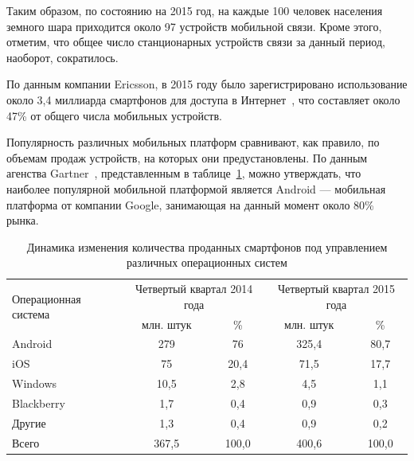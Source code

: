 Таким образом, по состоянию на 2015 год, на каждые 100 человек
населения земного шара приходится около 97 устройств мобильной связи.
Кроме этого, отметим, что общее число станционарных устройств связи
за данный период, наоборот, сократилось.

По данным компании Ericsson, в 2015 году было зарегистрировано использование
около 3{,}4 миллиарда смартфонов для доступа в Интернет~\cite{ericsson_mobility_report},
что составляет около 47\% от общего числа мобильных устройств.

Популярность различных мобильных платформ сравнивают, как правило,
по объемам продаж устройств, на которых они предустановлены.
По данным агенства Gartner~\cite{gartner_smartphone_stat}, представленным
в таблице~\ref{tbl:gartner_platform_stat}, можно утверждать, что наиболее популярной
мобильной платформой является Android --- мобильная платформа от
компании Google, занимающая на данный момент около 80\% рынка.

\begin{table} [h!]
  \caption{
    Динамика изменения количества проданных смартфонов под
    управлением различных операционных систем
  }\label{tbl:gartner_platform_stat}
    \begin{tabular}{| m{6.6cm} | c | c | c | c |}
      \hline

      \multirow{2}{*}{
      \parbox{6.6cm}{
      \smallskip
      \centering Операционная система
      \smallskip
      }
      }
      & \multicolumn{2}{c|}{
          \parbox{4.5cm}{
            \smallskip
            \centering Четвертый квартал 2014 года
            \smallskip
          }
        }
      & \multicolumn{2}{c|}{
          \parbox{4.5cm}{
            \smallskip
            \centering Четвертый квартал 2015 года
            \smallskip
          }
        } \\
      \cline{2-5}

      & млн. штук & \% & млн. штук & \% \\
      \hline

      Android &  279 & 76 & 325{,}4 & 80{,}7 \\
      \hline

      iOS &  75 & 20{,}4 & 71{,}5 & 17{,}7 \\
      \hline

      Windows & 10{,}5 & 2{,}8 & 4{,}5 & 1{,}1 \\
      \hline

      Blackberry & 1{,}7 & 0{,}4 & 0{,}9 & 0{,}3 \\
      \hline

      Другие & 1{,}3 & 0{,}4 & 0{,}9 & 0{,}2 \\
      \hline

      Всего & 367{,}5 & 100{,}0 & 400{,}6 & 100{,}0 \\
      \hline
    \end{tabular}
\end{table}

